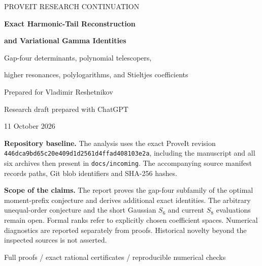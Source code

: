 \documentclass[11pt,letterpaper]{article}
\numberwithin{equation}{section}
\theoremstyle{plain}
\theoremstyle{definition}
\theoremstyle{remark}
\newcommand{\src}[1]{\nolinkurl{#1}}
\begin{document}
\hypersetup{pageanchor=false}
\begin{titlepage}
\centering
\vspace*{1.0cm}
{\sffamily\color{accent}\Large PROVEIT RESEARCH CONTINUATION\par}
\vspace{1cm}
{\color{ink}\LARGE\bfseries Exact Harmonic-Tail Reconstruction\par}
\vspace{0.3cm}
{\color{ink}\LARGE\bfseries and Variational Gamma Identities\par}
\vspace{0.75cm}
{\large Gap-four determinants, polynomial telescopers,\par
higher resonances, polylogarithms, and Stieltjes coefficients\par}
\vspace{0.9cm}
{\large Prepared for Vladimir Reshetnikov\par}
\vspace{0.2cm}
{Research draft prepared with ChatGPT\par}
\vspace{0.25cm}
{11 October 2026\par}
\vspace{0.8cm}
\begin{minipage}{0.91\textwidth}
\small
\textbf{Repository baseline.} The analysis uses the exact ProveIt revision
\src{446dca9bd65c20e409d1d2561d4ffad408103e2a},
including the manuscript and all six archives then present in
\src{docs/incoming}. The accompanying source manifest records paths,
Git blob identifiers and SHA-256 hashes.

\medskip
\textbf{Scope of the claims.} The report proves the gap-four subfamily of
the optimal moment-prefix conjecture and derives additional exact
identities. The arbitrary unequal-order conjecture and the short
Gaussian $S_6$ and current $S_8$ evaluations remain open. Formal ranks
refer to explicitly chosen coefficient spaces. Numerical diagnostics
are reported separately from proofs. Historical novelty beyond the
inspected sources is not asserted.
\end{minipage}
\vfill
{\small\sffamily Full proofs \enspace / \enspace exact rational certificates
\enspace / \enspace reproducible numerical checks\par}
\end{titlepage}
\hypersetup{pageanchor=true}
\end{document}
